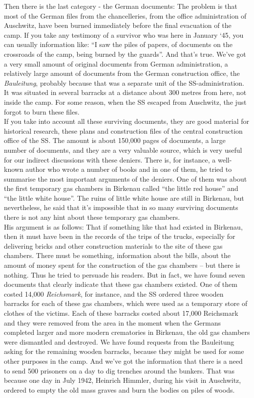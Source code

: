 Then there is the last category - the German documents: The problem is that most of the German files from the chancelleries, from the office administration of Auschwitz, have been burned immediately before the final evacuation of the camp. If you take any testimony of a survivor who was here in January ‘45, you can usually information like: ``I saw the piles of papers, of documents on the crossroads of the camp, being burned by the guards''. And that's true. We've got a very small amount of original documents from German administration, a relatively large amount of documents from the German construction office, the \textit{Bauleitung}, probably because that was a separate unit of the SS-administration. It was situated in several barracks at a distance about 300 metres from here, not inside the camp. For some reason, when the SS escaped from Auschwitz, the just forgot to burn these files. \\
If you take into account all these surviving documents, they are good material for historical research, these plans and construction files of the central construction office of the SS. The amount is about 150,000 pages of documents, a large number of documents, and they are a very valuable source, which is very useful for our indirect discussions with these deniers. There is, for instance, a well-known author who wrote a number of books and in one of them, he tried to summarise the most important arguments of the deniers. One of them was about the first temporary gas chambers in Birkenau called ``the little red house'' and ``the little white house''. The ruins of little white house are still in Birkenau, but nevertheless, he said that it’s impossible that in so many surviving documents there is not any hint about these temporary gas chambers.\\ 
His argument is as follows: That if something like that had existed in Birkenau, then it must have been in the records of the trips of the trucks, especially for delivering bricks and other construction materials to the site of these gas chambers. There must be something, information about the bills, about the amount of money spent for the construction of the gas chambers – but there is nothing. Thus he tried to persuade his readers. But in fact, we have found seven documents that clearly indicate that these gas chambers existed. One of them costed 14,000 \textit{Reichsmark}, for instance, and the SS ordered three wooden barracks for each of these gas chambers, which were used as a temporary store of clothes of the victims. Each of these barracks costed about 17,000 Reichsmark and they were removed from the area in the moment when the Germans completed larger and more modern crematories in Birkenau, the old gas chambers were dismantled and destroyed. We have found requests from the Bauleitung asking for the remaining wooden barracks, because they might be used for some other purposes in the camp. And we’ve got the information that there is a need to send 500 prisoners on a day to dig trenches around the bunkers. That was because one day in July 1942, Heinrich Himmler, during his visit in Auschwitz, ordered to empty the old mass graves and burn the bodies on piles of woods.\\ 

